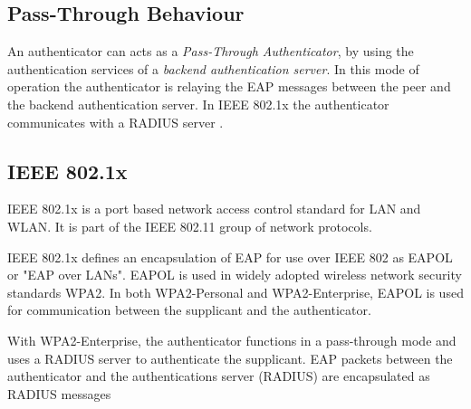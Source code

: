\subsection{Pass-Through Behaviour}
An authenticator can acts as a \textit{Pass-Through Authenticator}, by using the authentication services of a \textit{backend authentication server}.
In this mode of operation the authenticator is relaying the EAP messages between the peer and the backend authentication server.
In IEEE 802.1x the authenticator communicates with a RADIUS server \cite{congdon2003ieee}.

\subsection{IEEE 802.1x}

IEEE 802.1x is a port based network access control standard for LAN and WLAN.
It is part of the IEEE 802.11 group of network protocols.

IEEE 802.1x defines an encapsulation of EAP for use over IEEE 802 as EAPOL or "EAP over LANs".
EAPOL is used in widely adopted wireless network security standards WPA2. 
In both WPA2-Personal and WPA2-Enterprise, EAPOL is used for communication between the supplicant and the authenticator.

With WPA2-Enterprise, the authenticator functions in a pass-through mode and uses a RADIUS server to authenticate the supplicant.
EAP packets between the authenticator and the authentications server (RADIUS) are encapsulated as RADIUS messages \cite{aboba2003radius, chen2005extensible, congdon2003ieee}